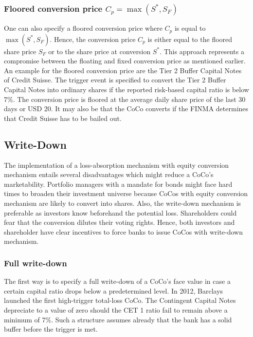 \subsubsection*{Floored conversion price $C_p = \max\left( S^*, S_F \right)$}
One can also specify a floored conversion price where $C_p$ is equal to $\max\left( S^*, S_F \right)$. Hence, the conversion price $C_p$ is either equal to the floored share price $S_F$ or to the share price at conversion $S^*$. This approach represents a compromise between the floating and fixed conversion price as mentioned earlier. \citep{de2014handbook} An example for the floored conversion price are the Tier 2 Buffer Capital Notes of Credit Suisse. %
The trigger event is specified to convert the Tier 2 Buffer Capital Notes into ordinary shares if the reported risk-based capital ratio is below 7\%. The conversion price is floored at the average daily share price of the last 30 days or USD 20. It may also be that the CoCo converts if the FINMA determines that Credit Suisse has to be bailed out. \citep{creditsuisse2011}

\subsection{Write-Down}
The implementation of a loss-absorption mechanism with equity conversion mechanism entails several disadvantages which might reduce a CoCo's marketability. Portfolio managers with a mandate for bonds might face hard times to broaden their investment universe because CoCos with equity conversion mechanism are likely to convert into shares. Also, the write-down mechanism is preferable as investors know beforehand the potential loss. Shareholders could fear that the conversion dilutes their voting rights. Hence, both investors and shareholder have clear incentives to force banks to issue CoCos with write-down mechanism. \citep{de2014handbook} 

\subsubsection*{Full write-down}
The first way is to specify a full write-down of a CoCo's face value in case a certain capital ratio drops below a predetermined level. \citep{de2014handbook} In 2012, Barclays launched the first high-trigger total-loss CoCo. The Contingent Capital Notes depreciate to a value of zero should the CET 1 ratio fail to remain above a minimum of 7\%. Such a structure assumes already that the bank has a solid buffer before the trigger is met. \citep{barclays2010}

